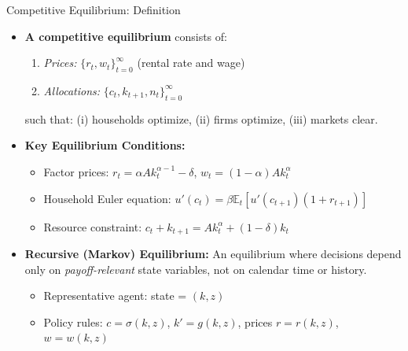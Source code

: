 \begin{frame}{Competitive Equilibrium: Definition}
\begin{itemize}
\item \textbf{A competitive equilibrium} consists of:
\begin{enumerate}
    \item \emph{Prices:} $\{r_t, w_t\}_{t=0}^\infty$ (rental rate and wage)
    \item \emph{Allocations:} $\{c_t, k_{t+1}, n_t\}_{t=0}^\infty$
\end{enumerate}
such that: (i) households optimize, (ii) firms optimize, (iii) markets clear.

\medskip
\item \textbf{Key Equilibrium Conditions:}
\begin{itemize}
    \item Factor prices: $r_t = \alpha A k_t^{\alpha-1} - \delta$, \quad $w_t = (1-\alpha)A k_t^\alpha$
    \item Household Euler equation: $u'(c_t) = \beta \mathbb{E}_t[u'(c_{t+1})(1 + r_{t+1})]$
    \item Resource constraint: $c_t + k_{t+1} = A k_t^\alpha + (1-\delta)k_t$
\end{itemize}

\medskip
\item \textbf{Recursive (Markov) Equilibrium:} An equilibrium where decisions depend only on \emph{payoff-relevant} state variables, not on calendar time or history.
\begin{itemize}
    \item Representative agent: state = $(k, z)$
    \item Policy rules: $c = \sigma(k,z)$, $k' = g(k,z)$, prices $r = r(k,z)$, $w = w(k,z)$
\end{itemize}
\end{itemize}
\end{frame}

